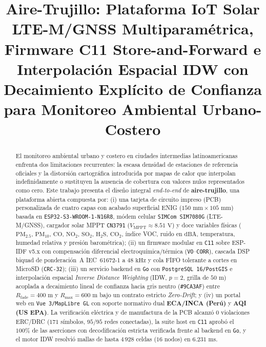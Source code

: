 \documentclass[conference]{IEEEtran}
\begin{document}
\title{Aire-Trujillo: Plataforma IoT Solar LTE-M/GNSS Multiparamétrica, Firmware C11 Store-and-Forward e Interpolación Espacial IDW con Decaimiento Explícito de Confianza para Monitoreo Ambiental Urbano-Costero}

\author{
}

\maketitle

\begin{abstract}
El monitoreo ambiental urbano y costero en ciudades intermedias latinoamericanas enfrenta dos limitaciones recurrentes: la escasa densidad de estaciones de referencia oficiales y la distorsión cartográfica introducida por mapas de calor que interpolan indefinidamente o sustituyen la ausencia de cobertura con valores nulos representados como cero. Este trabajo presenta el diseño integral \emph{end-to-end} de \textbf{aire-trujillo}, una plataforma abierta compuesta por: (i) una tarjeta de circuito impreso (PCB) personalizada de cuatro capas con acabado superficial ENIG ($150\text{ mm} \times 105\text{ mm}$) basada en \texttt{ESP32-S3-WROOM-1-N16R8}, módem celular \texttt{SIMCom SIM7080G} (LTE-M/GNSS), cargador solar MPPT \texttt{CN3791} ($V_{\mathrm{MPPT}} \approx 8.51\text{ V}$) y doce variables físicas ($\text{PM}_{2.5}$, $\text{PM}_{10}$, $\text{CO}$, $\text{NO}_2$, $\text{SO}_2$, $\text{H}_2\text{S}$, $\text{CO}_2$, índice VOC, ruido en $\text{dBA}$, temperatura, humedad relativa y presión barométrica); (ii) un firmware modular en \texttt{C11} sobre ESP-IDF v5.x con compensación diferencial electroquímica/térmica (\texttt{VO}--\texttt{CORR}), cascada DSP biquad de ponderación~A IEC~61672-1 a $48\text{ kHz}$ y cola FIFO tolerante a cortes en MicroSD (\texttt{CRC-32}); (iii) un servicio backend en \texttt{Go} con \texttt{PostgreSQL~16/PostGIS} e interpolación espacial \emph{Inverse Distance Weighting} (IDW, $p=2$, grilla de $50\text{ m}$) acoplada a decaimiento lineal de confianza hacia gris neutro (\texttt{\#9CA3AF}) entre $R_{\mathrm{fade}}=400\text{ m}$ y $R_{\max}=600\text{ m}$ bajo un contrato estricto \emph{Zero-Drift}; y (iv) un portal web en \texttt{Vue~3/MapLibre GL} con soporte normativo dual \textbf{ECA/INCA (Perú)} y \textbf{AQI (US EPA)}. La verificación eléctrica y de manufactura de la PCB alcanzó $0$ violaciones ERC/DRC ($171$ símbolos, $95/95$ redes conectadas), la suite host en \texttt{C11} aprobó el $100\%$ de las aserciones con decodificación estricta verificada frente al backend en \texttt{Go}, y el motor IDW resolvió mallas de hasta $4\,928$ celdas ($16$ nodos) en $6.231\text{ ms}$.
\end{abstract}
\end{document}
